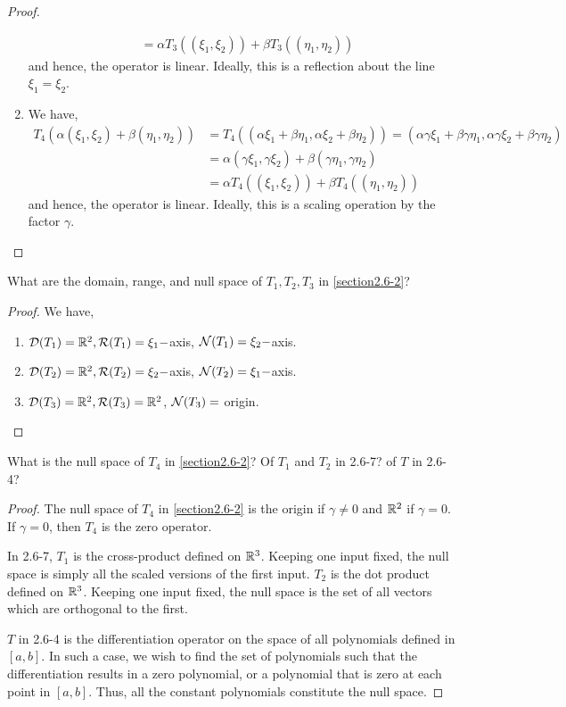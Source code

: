 \begin{proof}
\begin{enumerate}
\begin{align*}
            &= \alpha T_3((\xi_1 , \xi_2)) + \beta T_3((\eta_1 , \eta_2))
        \end{align*} 
        and hence, the operator is linear. Ideally, this is a reflection about the line $\xi_1 = \xi_2$.
        \item We have,
        \begin{align*}
            T_4(\alpha(\xi_1 , \xi_2) + \beta(\eta_1 , \eta_2)) &= T_4((\alpha \xi_1 + \beta \eta_1 , \alpha \xi_2 + \beta \eta_2)) 
            = (\alpha\gamma \xi_1 + \beta\gamma \eta_1, \alpha\gamma \xi_2 + \beta\gamma \eta_2 ) 
            \\
            &= \alpha (\gamma \xi_1 , \gamma\xi_2) + \beta (\gamma\eta_1 , \gamma\eta_2) \\
            &= \alpha T_4((\xi_1 , \xi_2)) + \beta T_4((\eta_1 , \eta_2))
        \end{align*} 
        and hence, the operator is linear. Ideally, this is a scaling operation by the factor $\gamma$.
    \end{enumerate}
\end{proof}

\begin{question}
    What are the domain, range, and null space of $T_1 , T_2 , T_3$ in \ref{section2.6-2}?
    \label{section2.6-3}
\end{question}
\begin{proof}
    We have,
    \begin{enumerate}
        \item $\mathcal{D}(T_1) = \mathbb{R}^2 , \mathcal{R}(T_1) = \xi_1-$axis, $\mathcal{N}(T_1) = \xi_2-$axis.
        \item $\mathcal{D}(T_2) = \mathbb{R}^2 , \mathcal{R}(T_2) = \xi_2-$axis, $\mathcal{N}(T_2) = \xi_1-$axis.
        \item $\mathcal{D}(T_3) = \mathbb{R}^2 , \mathcal{R}(T_3) = \mathbb{R}^2$, $\mathcal{N}(T_3)=$ origin.
    \end{enumerate}
\end{proof}

\begin{question}
    What is the null space of $T_4$ in \ref{section2.6-2}? Of $T_1$ and $T_2$ in 2.6-7? of $T$ in 2.6-4?
    \label{section2.6-4}
\end{question}
\begin{proof}
    The null space of $T_4$ in \ref{section2.6-2} is the origin if $\gamma \neq 0$ and $\mathbb{R}^2$ if $\gamma = 0$. If $\gamma = 0$, then $T_4$ is the zero operator.

    In 2.6-7, $T_1$ is the cross-product defined on $\mathbb{R}^3$. Keeping one input fixed, the null space is simply all the scaled versions of the first input. $T_2$ is the dot product defined on $\mathbb{R}^3$. Keeping one input fixed, the null space is the set of all vectors which are orthogonal to the first.

    $T$ in 2.6-4 is the differentiation operator on the space of all polynomials defined in $[a,b].$ In such a case, we wish to find the set of polynomials such that the differentiation results in a zero polynomial, or a polynomial that is zero at each point in $[a,b]$. Thus, all the constant polynomials constitute the null space.
 \end{proof}

